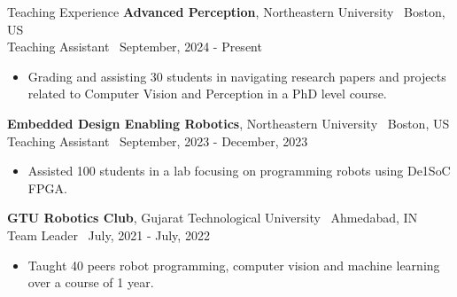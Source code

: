 \documentclass{resume}
\begin{document}
\begin{rSection}{Teaching Experience}
% 
{\bf Advanced Perception}{, Northeastern University} \hfill {\ {Boston, US}}\\
Teaching Assistant \hfill {\ September, 2024 - Present}
\begin{itemize}
  \item \vspace{-0.5em} Grading and assisting 30 students in navigating research papers and projects related to Computer Vision and Perception in a PhD level course. \vspace{-0.3em}
\end{itemize} 
{\bf Embedded Design Enabling Robotics}{, Northeastern University} \hfill {\ {Boston, US}}\\
Teaching Assistant \hfill {\ September, 2023 - December, 2023}
\begin{itemize}
  \item \vspace{-0.5em} Assisted 100 students in a lab focusing on programming robots using De1SoC FPGA. \vspace{-0.3em}
\end{itemize} 

{\bf GTU Robotics Club}{, Gujarat Technological University} \hfill {\ {Ahmedabad, IN}}\\
Team Leader \hfill {\ July, 2021 - July, 2022}
\begin{itemize}
  \item \vspace{-0.5em} Taught 40 peers robot programming, computer vision and machine learning over a course of 1 year. \vspace{-0.3em}
\end{itemize} 

\end{rSection}

\end{document}
